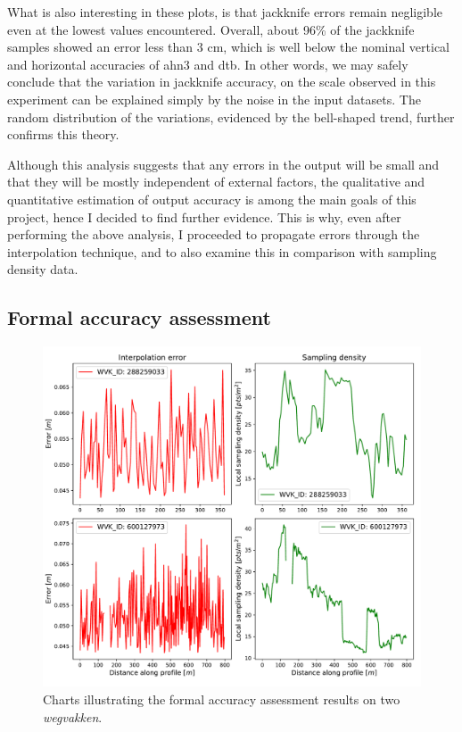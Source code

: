 What is also interesting in these plots, is that jackknife errors remain negligible even at the lowest values encountered. Overall, about 96\% of the jackknife samples showed an error less than 3 cm, which is well below the nominal vertical and horizontal accuracies of \ac{ahn3} and \ac{dtb}. In other words, we may safely conclude that the variation in jackknife accuracy, on the scale observed in this experiment can be explained simply by the noise in the input datasets. The random distribution of the variations, evidenced by the bell-shaped trend, further confirms this theory.

Although this analysis suggests that any errors in the output will be small and that they will be mostly independent of external factors, the qualitative and quantitative estimation of output accuracy is among the main goals of this project, hence I decided to find further evidence. This is why, even after performing the above analysis, I proceeded to propagate errors through the interpolation technique, and to also examine this in comparison with sampling density data.

\subsection{Formal accuracy assessment}
\label{sub:accuracyformal}

\begin{figure}
    \centering
    \includegraphics[width=0.9\linewidth]{final_report/figs/formalaccuracy0.pdf}
    \caption[Charts illustrating the formal accuracy assessment results on two LineStrings]{Charts illustrating the formal accuracy assessment results on two \textit{wegvakken}.}
    \label{fig:formalaccuracy0}
\end{figure}

